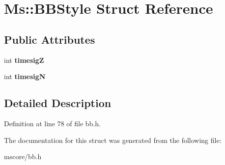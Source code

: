 \hypertarget{struct_ms_1_1_b_b_style}{}\section{Ms\+:\+:B\+B\+Style Struct Reference}
\label{struct_ms_1_1_b_b_style}
\subsection*{Public Attributes}
\begin{DoxyCompactItemize}
\item 
\mbox{\label{struct_ms_1_1_b_b_style_aa1e703d9948b3c2aa93bb2092d801d99}} 
int {\bfseries timesigZ}
\item 
\mbox{\label{struct_ms_1_1_b_b_style_a31ccb55dfec4a82ae317e62ceb730d59}} 
int {\bfseries timesigN}
\end{DoxyCompactItemize}


\subsection{Detailed Description}


Definition at line 78 of file bb.\+h.



The documentation for this struct was generated from the following file\+:\begin{DoxyCompactItemize}
\item 
mscore/bb.\+h\end{DoxyCompactItemize}
